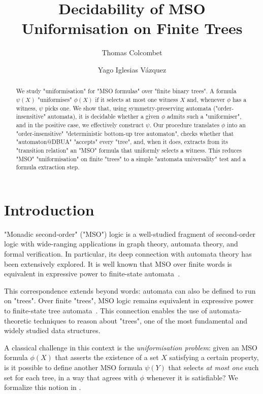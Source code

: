 \documentclass[a4paper,UKenglish,cleveref, autoref, thm-restate]{lipics-v2021}
\title{Decidability of MSO Uniformisation on Finite Trees}
\author{Thomas Colcombet}
	{CNRS, IRIF, Universit\'e Paris Diderot, France}
	{thomas.colcombet@irif.fr}
	{https://orcid.org/0000-0001-6529-6963}
	{}
\author{Yago Iglesias Vázquez}{Universit\'e Paris Diderot, France}{me@yagoiglesias.fr}{}{}
\begin{document}
\maketitle

\begin{abstract}
	We study "uniformisation" for "MSO formulas" over "finite binary trees". A formula $\psi(X)$ "uniformises" $\phi(X)$
	if it selects at most one witness $X$ and, whenever $\phi$ has a witness, $\psi$ picks one. We show that,
	using symmetry-preserving automata ("order-insensitive" automata), it is decidable whether a
	given $\phi$ admits such a "uniformiser", and in the positive case, we effectively construct $\psi$. Our procedure translates $\phi$ into
	an "order-insensitive" "deterministic bottom-up tree automaton", checks whether that "automaton@DBUA" "accepts" every "tree", and, when
	it does, extracts from its "transition relation" an "MSO" formula that uniformly selects a witness. This reduces "MSO" "uniformisation"
	on finite "trees" to a simple "automata universality" test and a formula extraction step.
\end{abstract}

\tableofcontents
{}
\newpage
\section{Introduction}

"Monadic second‐order" ("MSO") logic is a well-studied fragment of second-order logic with wide-ranging applications in graph theory, automata theory, and formal verification.
In particular, its deep connection with automata theory has been extensively explored. It is well known that MSO over finite words is equivalent in expressive power to
finite-state automata~\cite{Buchi60}.

This correspondence extends beyond words: automata can also be defined to run on "trees". Over finite "trees", MSO logic remains equivalent in expressive power to finite-state
tree automata~\cite{TW68, Don70}. This connection enables the use of automata-theoretic techniques to reason about "trees", one of the most fundamental and widely studied data
structures.

A classical challenge in this context is the \emph{uniformisation problem}: given an MSO formula $\phi(X)$ that asserts the existence of a set $X$ satisfying a certain property,
is it possible to define another MSO formula $\psi(Y)$ that selects \emph{at most one} such set for each tree, in a way that agrees with $\phi$ whenever it is satisfiable? We
formalize this notion in .
\end{document}
